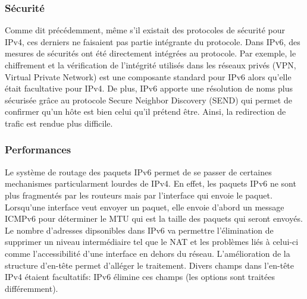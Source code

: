 \subsubsection{Sécurité}
Comme dit précédemment, même s'il existait des protocoles de sécurité pour
IPv4, ces derniers ne faisaient pas partie intégrante du protocole.  Dans IPv6,
des mesures de sécurités ont été directement intégrées au protocole.  Par
exemple, le chiffrement et la vérification de l'intégrité utilisés dans les
réseaux privés (VPN, Virtual Private Network) est une composante standard pour
IPv6 alors qu'elle était facultative pour IPv4. 
\smallbreak
De plus, IPv6 apporte une résolution de noms plus sécurisée grâce au protocole
Secure Neighbor Discovery (SEND) qui permet de confirmer qu'un hôte est bien
celui qu'il prétend être. Ainsi, la redirection de trafic est rendue plus
difficile.
\subsubsection{Performances}
Le système de routage des paquets IPv6 permet de se passer de certaines
mechanismes particularment lourdes de IPv4. En effet, les paquets IPv6 ne
sont plus fragmentés par les routeurs mais par l'interface qui envoie le
paquet. Lorsqu'une interface veut envoyer un paquet, elle envoie d'abord un
message ICMPv6 pour déterminer le MTU qui est la taille des paquets qui seront
envoyés.
\smallbreak
Le nombre d'adresses dipsonibles dans IPv6 va permettre l'élimination de
supprimer un niveau intermédiaire tel que le NAT et les problèmes liés à
celui-ci comme l'accessibilité d'une interface en dehors du réseau.
\smallbreak
L'amélioration de la structure d'en-tête permet d'alléger le traitement. Divers
champs dans l'en-tête IPv4 étaient facultatifs: IPv6 élimine ces champs (les
options sont traitées différemment).
